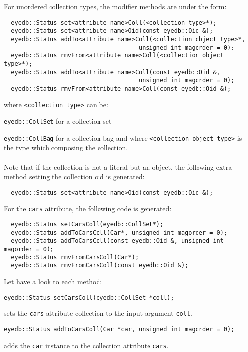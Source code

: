 For unordered collection types, the modifier methods are under the form:
\verbsize
\begin{verbatim}
  eyedb::Status set<attribute name>Coll(<collection type>*);
  eyedb::Status set<attribute name>Oid(const eyedb::Oid &);
  eyedb::Status addTo<attribute name>Coll(<collection object type>*,
                                      unsigned int magorder = 0);
  eyedb::Status rmvFrom<attribute name>Coll(<collection object type>*);
  eyedb::Status addTo<attribute name>Coll(const eyedb::Oid &,
                                      unsigned int magorder = 0);
  eyedb::Status rmvFrom<attribute name>Coll(const eyedb::Oid &);
\end{verbatim}
\normalsize
where \texttt{<collection type>} can be:
\be
\item \texttt{eyedb::CollSet} for a collection set
\item \texttt{eyedb::CollBag} for a collection bag
\ee
and where \texttt{<collection object type>} is the type which composing
the collection.
\\
\\
Note that if the collection is not a literal but an object, the following
extra method setting the collection oid is generated:
\verbsize
\begin{verbatim}
  eyedb::Status set<attribute name>Oid(const eyedb::Oid &);
\end{verbatim}
\normalsize
For the \texttt{cars} attribute, the following code is generated:
\verbsize
\begin{verbatim}
  eyedb::Status setCarsColl(eyedb::CollSet*);
  eyedb::Status addToCarsColl(Car*, unsigned int magorder = 0);
  eyedb::Status addToCarsColl(const eyedb::Oid &, unsigned int magorder = 0);
  eyedb::Status rmvFromCarsColl(Car*);
  eyedb::Status rmvFromCarsColl(const eyedb::Oid &);
\end{verbatim}
\normalsize
Let have a look to each method:
\be
\item
\verbsize
\begin{verbatim}
eyedb::Status setCarsColl(eyedb::CollSet *coll);
\end{verbatim}
\normalsize
sets the \texttt{cars} attribute collection to the input argument
\texttt{coll}.
\item
\verbsize
\begin{verbatim}
eyedb::Status addToCarsColl(Car *car, unsigned int magorder = 0);
\end{verbatim}
\normalsize
adds the \texttt{car} instance to the collection attribute \texttt{cars}.
